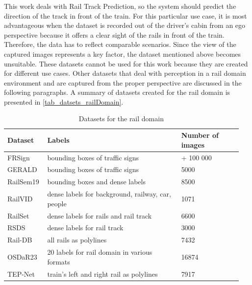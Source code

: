This work deals with Rail Track Prediction, so the system should predict the direction of the track in front of the train. For this particular use case, it is most advantageous when the dataset is recorded out of the driver's cabin from an ego perspective because it offers a clear sight of the rails in front of the train. Therefore, the data has to reflect comparable scenarios. 
Since the view of the captured images represents a key factor, the dataset mentioned above becomes unsuitable.
These datasets cannot be used for this work because they are created for different use cases.
Other datasets that deal with perception in a rail domain environment and are captured from the proper perspective are discussed in the following paragraphs. A summary of datasets created for the rail domain is presented in \autoref{tab_datsets_railDomain}.

\begin{table}[H]
\centering
\caption{Datasets for the rail domain}\label{tab_datsets_railDomain}
\begin{tabular}{| p{0.15\linewidth} | p{0.55\linewidth} | p{0.25\linewidth} |}\hline
\textbf{Dataset} & \textbf{Labels} & \textbf{Number of images}\\\hline
FRSign              & bounding boxes of traffic signs & + 100 000 \\\hline
GERALD              & bounding boxes of traffic signs & 5000 \\\hline
RailSem19           & bounding boxes and dense labels & 8500 \\\hline
RailVID             & dense labels for background, railway, car, people & 1071 \\\hline
RailSet             & dense labels for rails and rail track & 6600 \\\hline
RSDS                & dense labels for rail track & 3000 \\\hline
Rail-DB             & all rails as polylines & 7432 \\\hline
OSDaR23             & 20 labels for rail domain in various formats & 16874 \\\hline
TEP-Net             & train's left and right rail as polylines & 7917 \\\hline
\end{tabular}
\end{table}

